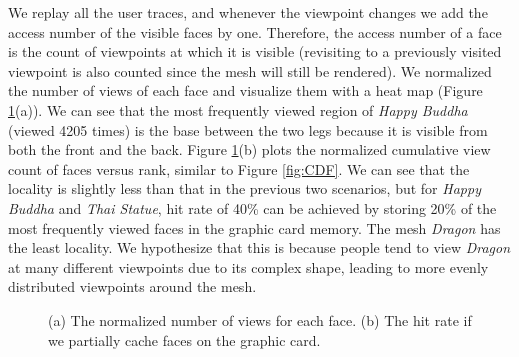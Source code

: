 We replay all the user traces, and whenever the viewpoint changes 
we add the access number of the visible faces by one. 
Therefore, the access number of a face is the count of viewpoints at 
which it is visible (revisiting to a previously visited viewpoint is also counted
since the mesh will still be rendered). 
We normalized the number of views of each face and visualize them with
 a heat map (Figure \ref{fig:heat_map}(a)). 
We can see that the most frequently viewed region of \textit{Happy Buddha} (viewed 4205 times) is 
the base between the two legs because it is visible from both the front and the back.
Figure \ref{fig:heat_map}(b) plots the normalized cumulative view count of faces versus rank, 
similar to Figure \ref{fig:CDF}. We can see that the locality is slightly less than
that in the previous two scenarios, but for \textit{Happy Buddha} and \textit{Thai Statue}, hit rate of 40\%  can be achieved
by storing 20\% of the most frequently viewed faces in the graphic card memory.
The mesh \textit{Dragon} has the least locality. We hypothesize that this is because %
people tend to view \textit{Dragon} at many different viewpoints due to its complex shape,
leading to more evenly distributed viewpoints around the mesh.
    
\begin{figure}[htp!]
\begin{center}
\caption{(a) The normalized number of views for each face. (b) The hit rate if we partially cache faces on the graphic card.\label{fig:heat_map}}
\end{center}
\end{figure}

